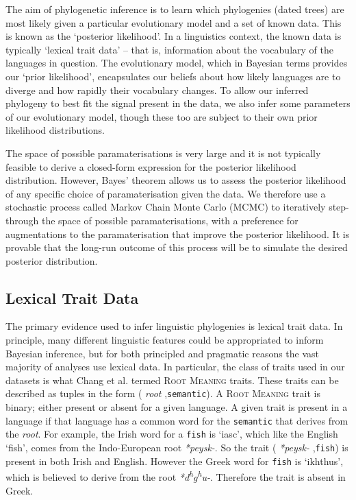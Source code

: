 \documentclass[10pt,journal,compsoc]{IEEEtran}
\newcommand{\ts}{\textsuperscript}
\begin{document}
The aim of phylogenetic inference is to learn which phylogenies (dated trees) are most likely given a particular evolutionary model and a set of known data. This is known as the `posterior likelihood'. In a linguistics context, the known data is typically `lexical trait data' -- that is, information about the vocabulary of the languages in question. The evolutionary model, which in Bayesian terms provides our `prior likelihood', encapsulates our beliefs about how likely languages are to diverge and how rapidly their vocabulary changes. To allow our inferred phylogeny to best fit the signal present in the data, we also infer some parameters of our evolutionary model, though these too are subject to their own prior likelihood distributions.

The space of possible paramaterisations is very large and it is not typically feasible to derive a closed-form expression for the posterior likelihood distribution. However, Bayes' theorem allows us to assess the posterior likelihood of any specific choice of paramaterisation given the data. We therefore use a stochastic process called Markov Chain Monte Carlo (MCMC) to iteratively step-through the space of possible paramaterisations, with a preference for augmentations to the paramaterisation that improve the posterior likelihood. It is provable that the long-run outcome of this process will be to simulate the desired posterior distribution.

\subsection{Lexical Trait Data}

The primary evidence used to infer linguistic phylogenies is lexical trait data. In principle, many different linguistic features could be appropriated to inform Bayesian inference, but for both principled and pragmatic reasons the vast majority of analyses use lexical data. In particular, the class of traits used in our datasets is what Chang et al. termed \textsc{Root Meaning} traits. These traits can be described as tuples in the form (\textit{ root },\;\texttt{semantic}\;). A \textsc{Root Meaning} trait is binary; either present or absent for a given language. A given trait is present in a language if that language has a common word for the \texttt{semantic} that derives from the \textit{root}. For example, the Irish word for a \texttt{fish} is `iasc', which like the English `fish', comes from the Indo-European root \textit{*peysk-}. So the trait (\textit{ *peysk- },\;\texttt{fish}\;) is present in both Irish and English. However the Greek word for \texttt{fish} is `ikhthus', which is believed to derive from the root \textit{*d\ts{h}g\ts{h}u-}. Therefore the trait is absent in Greek.
\end{document}
